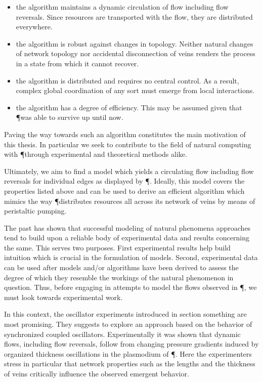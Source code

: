 	\begin{itemize}
		\item the algorithm maintains a dynamic circulation of flow including flow reversals. Since resources are transported with the flow, they are distributed everywhere.
		\item the algorithm is robust against changes in topology. Neither natural changes of network topology nor accidental disconnection of veins renders the process in a state from which it cannot recover.
		\item the algorithm is distributed and requires no central control. As a result, complex global coordination of any sort must emerge from local interactions.
		\item the algorithm has a degree of efficiency. This may be assumed given that \P was able to survive up until now.
	\end{itemize}

	Paving the way towards such an algorithm constitutes the main motivation of this thesis. In particular we seek to contribute to the field of natural computing with \P through experimental and theoretical methods alike.

	Ultimately, we aim to find a model which yields a circulating flow including flow reversals for individual edges as displayed by \P. Ideally, this model covers the properties listed above and can be used to derive an efficient algorithm which mimics the way \P distributes resources all across its network of veins by means of peristaltic pumping. 

	The past has shown that successful modeling of natural phenomena approaches tend to build upon a reliable body of experimental data and results concerning the same. This serves two purposes. First experimental results help build intuition which is crucial in the formulation of models. Second, experimental data can be used after models and/or algorithms have been derived to assess the degree of which they resemble the workings of the natural phenomenon in question. Thus, before engaging in attempts to model the flows observed in \P, we must look towards experimental work.

	In this context, the oscillator experiments introduced in section something are most promising. They suggests to explore an approach based on the behavior of synchronized coupled oscillators. Experimentally it was shown that dynamic flows, including flow reversals, follow from changing pressure gradients induced by organized thickness oscillations in the plasmodium of \P. Here the experimenters stress in particular that network properties such as the lengths and the thickness of veins critically influence the observed emergent behavior. 

